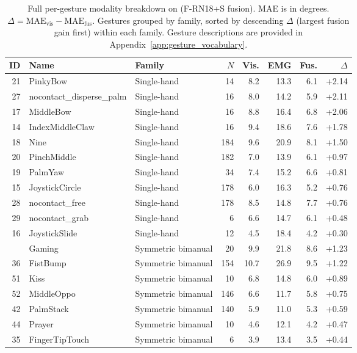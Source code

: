 \begin{table}[h]
\centering
\caption{Full per-gesture modality breakdown on \dataset{} (F-RN18+S fusion). MAE is in degrees. $\Delta = \text{MAE}_\text{vis} - \text{MAE}_\text{fus}$. Gestures grouped by family, sorted by descending $\Delta$ (largest fusion gain first) within each family. Gesture descriptions are provided in Appendix~\ref{app:gesture_vocabulary}.}
\label{tab:per_gesture_full}
\scriptsize
\setlength{\tabcolsep}{2.2pt}
\renewcommand{\arraystretch}{1.02}
\begin{tabular}{rllrrrrr}
\toprule
ID & Name & Family & $N$ & Vis. & EMG & Fus. & $\Delta$ \\
\midrule
21 & PinkyBow & Single-hand & 14 & 8.2 & 13.3 & 6.1 & +2.14 \\
27 & nocontact\_disperse\_palm & Single-hand & 16 & 8.0 & 14.2 & 5.9 & +2.11 \\
17 & MiddleBow & Single-hand & 16 & 8.8 & 16.4 & 6.8 & +2.06 \\
14 & IndexMiddleClaw & Single-hand & 16 & 9.4 & 18.6 & 7.6 & +1.78 \\
18 & Nine & Single-hand & 184 & 9.6 & 20.9 & 8.1 & +1.50 \\
20 & PinchMiddle & Single-hand & 182 & 7.0 & 13.9 & 6.1 & +0.97 \\
19 & PalmYaw & Single-hand & 34 & 7.4 & 15.2 & 6.6 & +0.81 \\
15 & JoystickCircle & Single-hand & 178 & 6.0 & 16.3 & 5.2 & +0.76 \\
28 & nocontact\_free & Single-hand & 178 & 8.5 & 14.8 & 7.7 & +0.76 \\
29 & nocontact\_grab & Single-hand & 6 & 6.6 & 14.7 & 6.1 & +0.48 \\
16 & JoystickSlide & Single-hand & 12 & 4.5 & 18.4 & 4.2 & +0.30 \\
\addlinespace[3pt]
37 & Gaming & Symmetric bimanual & 20 & 9.9 & 21.8 & 8.6 & +1.23 \\
36 & FistBump & Symmetric bimanual & 154 & 10.7 & 26.9 & 9.5 & +1.22 \\
51 & Kiss & Symmetric bimanual & 10 & 6.8 & 14.8 & 6.0 & +0.89 \\
52 & MiddleOppo & Symmetric bimanual & 146 & 6.6 & 11.7 & 5.8 & +0.75 \\
42 & PalmStack & Symmetric bimanual & 140 & 5.9 & 11.0 & 5.3 & +0.59 \\
44 & Prayer & Symmetric bimanual & 10 & 4.6 & 12.1 & 4.2 & +0.47 \\
35 & FingerTipTouch & Symmetric bimanual & 6 & 3.9 & 13.4 & 3.5 & +0.44 \\

\end{tabular}
\end{table}

